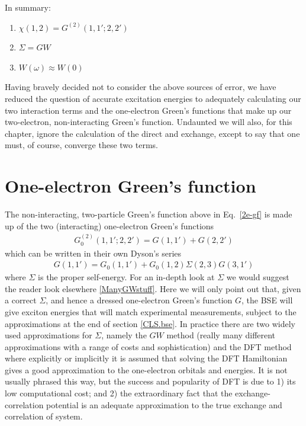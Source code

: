 \documentclass[11pt]{report}
\begin{document}
In summary:
\begin{enumerate}
\item{ $\chi(1,2) = G^{(2)}(1,1';2,2')$ }
\item{ $\Sigma = GW$ }
\item{ $W(\omega) \approx W(0)$ }
\end{enumerate}
Having bravely decided not to consider the above sources of error, we have reduced the question of accurate excitation energies to adequately calculating our two interaction terms and the one-electron Green's functions that make up our two-electron, non-interacting Green's function.
Undaunted we will also, for this chapter, ignore the calculation of the direct and exchange, except to say that one must, of course, converge these two terms.

\section{One-electron Green's function}

The non-interacting, two-particle Green's function above in Eq.~\ref{2e-gf} is made up of the two (interacting) one-electron Green's functions
\begin{align}
G_0^{(2)}(1,1';2,2') = G(1,1') + G(2,2') 
\end{align}
which can be written in their own Dyson's series
\begin{align} 
G(1,1') = G_0(1,1') + G_0(1,2) \Sigma(2,3) G(3,1')
\end{align}
where $\Sigma$ is the proper self-energy.
For an in-depth look at $\Sigma$ we would suggest the reader look elsewhere \ref{ManyGWstuff}.
Here we will only point out that, given a correct $\Sigma$, and hence a dressed one-electron Green's function $G$, the BSE will give exciton energies that will match experimental measurements, subject to the approximations at the end of section \ref{CLS.bse}. 
In practice there are two widely used approximations for $\Sigma$, namely the $GW$ method (really many different approximations with a range of costs and sophistication) and the DFT method where explicitly or implicitly it is assumed that solving the DFT Hamiltonian gives a good approximation to the one-electron orbitals and energies.
It is not usually phrased this way, but the success and popularity of DFT is due to 1) its low computational cost; and 2) the extraordinary fact that the exchange-correlation potential is an adequate approximation to the true exchange and correlation of system. 
\end{document}
